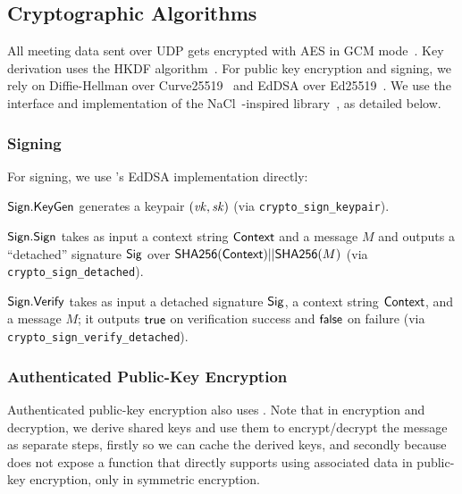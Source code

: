 \subsection{Cryptographic Algorithms}

All meeting data sent over UDP gets encrypted with AES in GCM mode~\cite{sp80038d}.
%
Key derivation uses the HKDF algorithm~\cite{rfc5869}.
%
For public key encryption and signing, we rely on Diffie-Hellman over Curve25519~\cite{bernstein2006curve25519} and EdDSA over Ed25519~\cite{eddsa}.
%
We use the interface and implementation of the NaCl~\cite{nacl}-inspired \sodium{} library~\cite{libsodium}, as detailed below.

\subsubsection{Signing}

For signing, we use \sodium 's EdDSA implementation directly:
%
\begin{itemize*}
   \item ${\sf Sign}.\mathsf{KeyGen}$ generates a keypair $(\mathit{vk}, \mathit{sk})$ (via \texttt{crypto\_sign\_keypair}).
   \item ${\sf Sign}.\mathsf{Sign}$ takes as input a context string ${\sf Context}$ and a message $M$ and outputs a ``detached'' signature
   ${\sf Sig}$ over ${\sf SHA256}({\sf Context}) || {\sf SHA256}(M)$ (via \texttt{crypto\_sign\_detached}).
   \item ${\sf Sign}.\mathsf{Verify}$ takes as input a detached signature ${\sf Sig}$, a context string ${\sf Context}$, and a message $M$; it outputs $\mathsf{true}$ on verification success
   and $\mathsf{false}$ on failure
   (via \texttt{crypto\_\-sign\_\-verify\_\-detached}).
\end{itemize*}

\subsubsection{Authenticated Public-Key Encryption}

Authenticated public-key encryption also uses \sodium. Note that in encryption
and decryption, we derive shared keys and use them to encrypt/decrypt the
message as separate steps, firstly so we can cache the derived keys, and
secondly because \sodium{} does not expose a function that directly supports
using associated data in public-key encryption, only in symmetric encryption.


